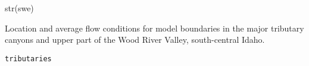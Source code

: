 \documentclass[a4paper]{book}
\begin{document}
%
\begin{Examples}
\begin{ExampleCode}
str(swe)

\end{ExampleCode}
\end{Examples}
%
\begin{Description}\relax
Location and average flow conditions for model boundaries in the
major tributary canyons and upper part of the Wood River Valley, south-central Idaho.
\end{Description}
%
\begin{Usage}
\begin{verbatim}
tributaries
\end{verbatim}
\end{Usage}
%
\end{document}
